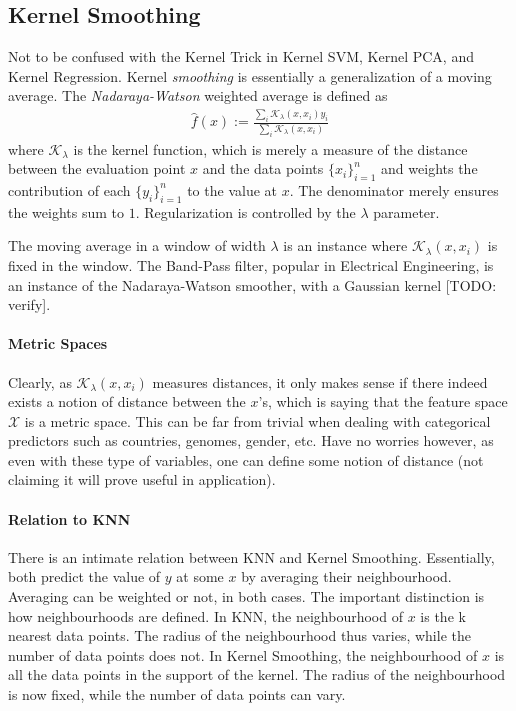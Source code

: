 \documentclass[12pt,a4paper]{article}
\theoremstyle{plain}
\theoremstyle{definition}
\newcommand{\hyp}{f}
\newcommand{\kernel}{\mathcal{K}}
\newcommand{\featureS}{\mathcal{X}}
\begin{document}
\subsection{Kernel Smoothing}
\label{sec:kernel}
Not to be confused with the Kernel Trick in Kernel SVM, Kernel PCA, and Kernel Regression.
Kernel \emph{smoothing} is essentially a generalization of a moving average.
The \emph{Nadaraya-Watson} weighted average is defined as 
\begin{align}
	\hat{\hyp}(x):= \frac{\sum_i \kernel_\lambda(x,x_i)y_i}{\sum_i \kernel_\lambda(x,x_i)}
\end{align}
where $\kernel_\lambda$ is the kernel function, which is merely a measure of the distance between the evaluation point $x$ and the data points $\{ x_i \}_{i=1}^n$ and weights the contribution of each $\{ y_i \}_{i=1}^n$ to the value at $x$.
The denominator merely ensures the weights sum to $1$.
Regularization is controlled by the $\lambda$ parameter.

The moving average in a window of width $\lambda$ is an instance where $\kernel_\lambda(x,x_i)$ is fixed in the window.
The Band-Pass filter, popular in Electrical Engineering, is an instance of the Nadaraya-Watson smoother, with a Gaussian kernel [TODO: verify].


\paragraph{Metric Spaces}
Clearly, as $\kernel_\lambda(x,x_i)$ measures distances, it only makes sense if there indeed exists a notion of distance between the $x$'s, which is saying that the feature space $\featureS$ is a metric space. 
This can be far from trivial when dealing with categorical predictors such as countries, genomes, gender, etc.
Have no worries however, as even with these type of variables, one can define some notion of distance (not claiming it will prove useful in application).


\paragraph{Relation to KNN}
There is an intimate relation between KNN and Kernel Smoothing. 
Essentially, both predict the value of $y$ at some $x$ by averaging their neighbourhood. 
Averaging can be weighted or not, in both cases.
The important distinction is how neighbourhoods are defined.
In KNN, the neighbourhood of $x$ is the k nearest data points. The radius of the neighbourhood thus varies, while the number of data points does not.
In Kernel Smoothing, the neighbourhood of $x$ is all the data points in the support of the kernel. The radius of the neighbourhood is now fixed, while the number of data points can vary.
\end{document}
